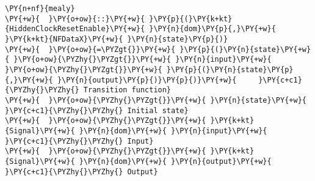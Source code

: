 \begin{Verbatim}[commandchars=\\\{\}]
\PY{n+nf}{mealy}
\PY{+w}{  }\PY{o+ow}{::}\PY{+w}{ }\PY{p}{(}\PY{k+kt}{HiddenClockResetEnable}\PY{+w}{ }\PY{n}{dom}\PY{p}{,}\PY{+w}{ }\PY{k+kt}{NFDataX}\PY{+w}{ }\PY{n}{state}\PY{p}{)}
\PY{+w}{  }\PY{o+ow}{=\PYZgt{}}\PY{+w}{ }\PY{p}{(}\PY{n}{state}\PY{+w}{ }\PY{o+ow}{\PYZhy{}\PYZgt{}}\PY{+w}{ }\PY{n}{input}\PY{+w}{ }\PY{o+ow}{\PYZhy{}\PYZgt{}}\PY{+w}{ }\PY{p}{(}\PY{n}{state}\PY{p}{,}\PY{+w}{ }\PY{n}{output}\PY{p}{)}\PY{p}{)}\PY{+w}{     }\PY{c+c1}{\PYZhy{}\PYZhy{} Transition function}
\PY{+w}{  }\PY{o+ow}{\PYZhy{}\PYZgt{}}\PY{+w}{ }\PY{n}{state}\PY{+w}{                                   }\PY{c+c1}{\PYZhy{}\PYZhy{} Initial state}
\PY{+w}{  }\PY{o+ow}{\PYZhy{}\PYZgt{}}\PY{+w}{ }\PY{k+kt}{Signal}\PY{+w}{ }\PY{n}{dom}\PY{+w}{ }\PY{n}{input}\PY{+w}{                        }\PY{c+c1}{\PYZhy{}\PYZhy{} Input}
\PY{+w}{  }\PY{o+ow}{\PYZhy{}\PYZgt{}}\PY{+w}{ }\PY{k+kt}{Signal}\PY{+w}{ }\PY{n}{dom}\PY{+w}{ }\PY{n}{output}\PY{+w}{                       }\PY{c+c1}{\PYZhy{}\PYZhy{} Output}
\end{Verbatim}
